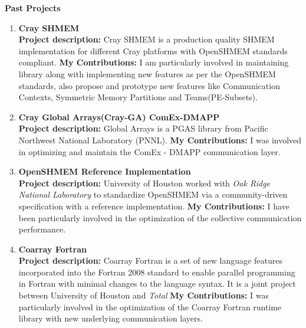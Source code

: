 \textbf{Past Projects}
\begin{enumerate}
\setcounter{enumi}{0}
\item \textbf{Cray SHMEM}\\
    \textbf{Project description:} Cray SHMEM is a production quality SHMEM
    implementation for different Cray platforms with OpenSHMEM standards
    compliant. \textbf{My Contributions:} I am particularly involved in
    maintaining library along with implementing new features as per the
    OpenSHMEM standards, also propose and prototype new features like
    Communication Contexts, Symmetric Memory Partitions and Teams(PE-Subsets).

\item \textbf{Cray Global Arrays(Cray-GA) ComEx-DMAPP}\\
    \textbf{Project description:} Global Arrays is a PGAS library from Pacific
    Northwest National Laboratory (PNNL). \textbf{My Contributions:} I was
    involved in optimizing and maintain the ComEx - DMAPP communication layer.

\item \textbf{OpenSHMEM Reference Implementation}\\
    \textbf{Project description:} University of Houston worked with \textit{Oak
    Ridge National Laboratory} to standardize OpenSHMEM via a community-driven
    specification with a reference implementation. \textbf{My Contributions:}
    I have been particularly involved in the optimization of the collective
    communication performance.

\item \textbf{Coarray Fortran}\\
    \textbf{Project description:} Coarray Fortran is a set of new language
    features incorporated into the Fortran 2008 standard to enable parallel
    programming in Fortran with minimal changes to the language syntax. It is a
    joint project between University of Houston and \textit{Total}
    \textbf{My Contributions:} I was particularly involved in the optimization
    of the Coarray Fortran runtime library with new underlying communication
    layers.
\end{enumerate}
